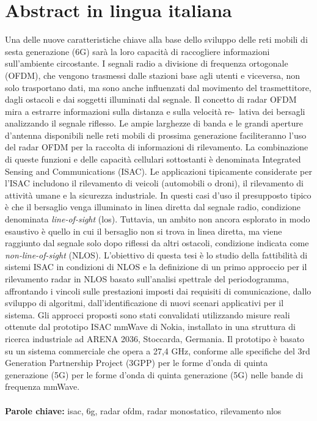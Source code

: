 \documentclass{Configuration_Files/PoliMi3i_thesis}
\begin{document}
\chapter*{Abstract in lingua italiana}
Una delle nuove caratteristiche chiave alla base dello sviluppo delle reti mobili di sesta generazione (6G) sarà la loro capacità di raccogliere informazioni sull'ambiente circostante. 
I segnali radio a divisione di frequenza ortogonale (OFDM), che vengono trasmessi dalle stazioni base agli utenti e viceversa, non solo trasportano dati, ma sono anche influenzati dal movimento del trasmettitore, dagli ostacoli e dai soggetti illuminati dal segnale.
Il concetto di radar OFDM mira a estrarre informazioni sulla distanza e sulla velocità re-\linebreak~lativa dei bersagli analizzando il segnale riflesso.
Le ampie larghezze di banda e le grandi aperture d'antenna disponibili nelle reti mobili di prossima generazione faciliteranno l'uso del radar OFDM per la raccolta di informazioni di rilevamento. 
La combinazione di queste funzioni e delle capacità cellulari sottostanti è denominata Integrated Sensing and Communications (ISAC). 
Le applicazioni tipicamente considerate per l'ISAC includono il rilevamento di veicoli (automobili o droni), il rilevamento di attività umane e la sicurezza industriale. 
In questi casi d'uso il presupposto tipico è che il bersaglio venga illuminato in linea diretta dal segnale radio, condizione denominata \textit{line-of-sight} (\gls{los}). Tuttavia, un ambito non ancora esplorato in modo esaustivo è quello in cui il bersaglio non si trova in linea diretta, ma viene raggiunto dal segnale solo dopo riflessi da altri ostacoli, condizione indicata come \textit{non-line-of-sight} (NLOS).
L'obiettivo di questa tesi è lo studio della fattibilità di sistemi ISAC in condizioni di NLOS e la definizione di un primo approccio per il rilevamento radar in NLOS basato sull'analisi spettrale del periodogramma, affrontando i vincoli sulle prestazioni imposti dai requisiti di comunicazione, dallo sviluppo di algoritmi, dall'identificazione di nuovi scenari applicativi per il sistema.
Gli approcci proposti sono stati convalidati utilizzando misure reali
ottenute dal prototipo ISAC mmWave di Nokia, installato in
una struttura di ricerca industriale ad ARENA 2036, Stoccarda, Germania. 
Il prototipo è basato su un sistema commerciale che opera a 27,4 GHz, conforme alle specifiche del 3rd Generation Partnership Project (3GPP) per le forme d'onda di quinta generazione (5G) per le forme d'onda di quinta generazione (5G) nelle bande di frequenza mmWave. 
\\
\\
\textbf{Parole chiave:} isac, 6g, radar ofdm, radar monostatico, rilevamento nlos %
\end{document}
